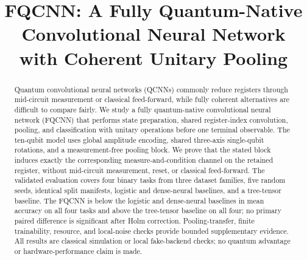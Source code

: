\documentclass[conference]{IEEEtran}
\begin{document}
\title{FQCNN: A Fully Quantum-Native Convolutional Neural Network with Coherent Unitary Pooling}

\author{
\and
{}
\and
{}
\and
{}
}

\maketitle

\begin{abstract}
Quantum convolutional neural networks (QCNNs) commonly reduce registers through
mid-circuit measurement or classical feed-forward, while fully coherent
alternatives are difficult to compare fairly. We study a fully quantum-native
convolutional neural network (FQCNN) that performs state preparation, shared
register-index convolution, pooling, and classification with unitary operations
before one terminal observable. The ten-qubit model uses global amplitude
encoding, shared three-axis single-qubit rotations, and a measurement-free
pooling block. We prove that the stated block induces exactly the corresponding
measure-and-condition channel on the retained register, without mid-circuit
measurement, reset, or classical feed-forward. The validated evaluation covers
four binary tasks from three dataset families, five random seeds, identical split
manifests, logistic and dense-neural baselines, and a tree-tensor baseline. The
FQCNN is below the logistic and dense-neural baselines in mean accuracy on all
four tasks and above the tree-tensor baseline on all four; no primary paired
difference is significant after Holm correction. Pooling-transfer, finite
trainability, resource, and local-noise checks provide bounded supplementary
evidence. All results are classical simulation or local fake-backend checks; no
quantum advantage or hardware-performance claim is made.
\end{abstract}
\end{document}
